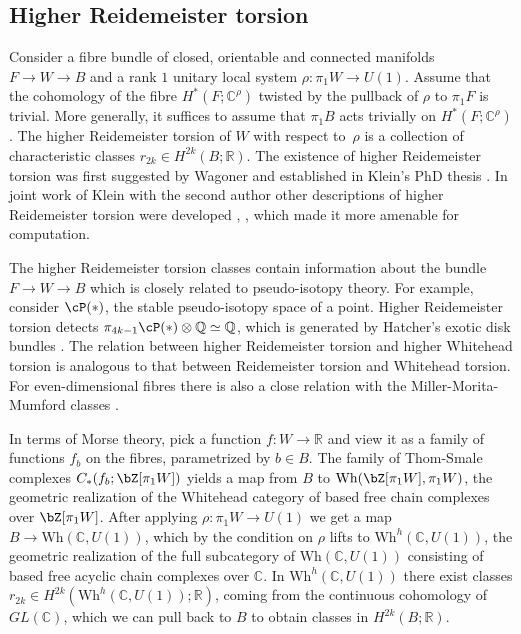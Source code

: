 \documentclass[JEP,XML,SOM,Unicode,NoFloatCountersInSection]{cedram}
\newcommand{\Wh}{\mathrm{Wh}}
\theoremstyle{plain}
\theoremstyle{definition}
\newcommand{\bC}{\mathbb{C}}\newcommand{\bD}{\mathbb{D}}
\newcommand{\bQ}{\mathbb{Q}}\newcommand{\bR}{\mathbb{R}}
\begin{document}
\subsection{Higher Reidemeister torsion}
Consider a fibre bundle of closed, orientable and connected manifolds $F \to W \to B$ and a rank $1$ unitary local system \hbox{$\rho : \pi_1W \to U(1)$}. Assume that the cohomology of the fibre $H^*(F;\bC^\rho)$ twisted by the pullback of $\rho$ to $\pi_1F$ is trivial. More generally, it suffices to assume that $\pi_1B$ acts trivially on $H^*(F;\bC^\rho)$. The higher Reidemeister torsion of $W$ with respect to~$\rho$ is a collection of characteristic classes $r_{2k} \in H^{2k}(B;\bR)$. The existence of higher Reidemeister torsion was first suggested by Wagoner \cite{W76} and established in Klein's PhD thesis \cite{K89}. In joint work of Klein with the second author other descriptions of higher Reidemeister torsion were developed \cite{IK93a}, \cite{IK93}, which made it more amenable for computation.

The higher Reidemeister torsion classes contain information about the bundle \hbox{$F \to W\to B$} which is closely related to pseudo-isotopy theory. For example, consider $\cP(\ast)$, the stable pseudo-isotopy space of a point. Higher Reidemeister torsion detects $\pi_{4k-1}\cP( \ast) \otimes \bQ \simeq \bQ$, which is generated by Hatcher's exotic disk bundles \cite{I02}. The relation between higher Reidemeister torsion and higher Whitehead torsion is analogous to that between Reidemeister torsion and Whitehead torsion. For even-dimensional fibres there is also a close relation with the Miller-Morita-Mumford classes \cite{I04}.

In terms of Morse theory, pick a function $f:W \to \bR$ and view it as a family of functions $f_b$ on the fibres, parametrized by $b \in B$. The family of Thom-Smale complexes $C_*(f_b;\bZ[\pi_1W])$ yields a map from $B$ to $\Wh(\bZ[\pi_1W],\pi_1W)$, the geometric realization of the Whitehead category of based free chain complexes over $\bZ[\pi_1W]$. After applying $\rho:\pi_1 W \to U(1)$ we get a map $B \to \Wh(\bC,U(1))$, which by the condition on $\rho$ lifts to $\Wh^h(\bC,U(1))$, the geometric realization of the full subcategory of $\Wh(\bC,U(1))$ consisting of based free acyclic chain complexes over $\bC$. In $\Wh^h(\bC,U(1))$ there exist classes $r_{2k} \in H^{2k}(\Wh^h(\bC,U(1)); \bR)$, coming from the continuous cohomology of $GL(\bC)$, which we can pull back to $B$ to obtain classes in $H^{2k}(B; \bR)$.
\end{document}
